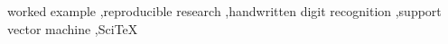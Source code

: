 \begin{keyword}
worked example \sep reproducible research \sep handwritten digit recognition \sep support vector machine \sep SciTeX
\end{keyword}

